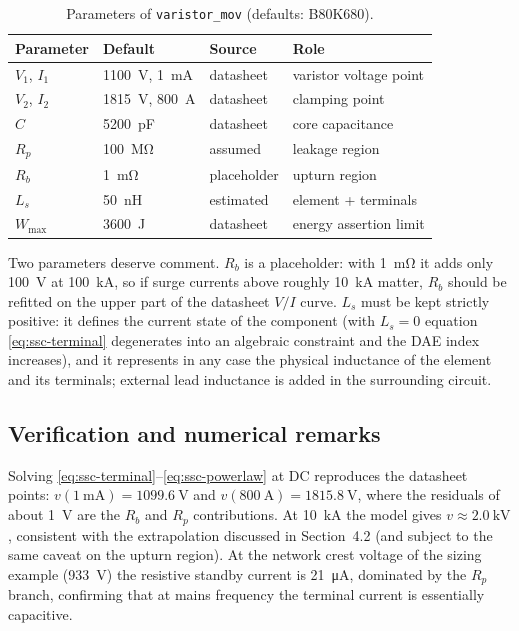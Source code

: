 \documentclass[11pt,a4paper]{article}
\begin{document}
\begin{table}[htb]
\centering
\caption{Parameters of \texttt{varistor\_mov} (defaults: B80K680).}
\label{tab:sscpar}
\begin{tabular}{llll}
\toprule
Parameter & Default & Source & Role \\
\midrule
$V_1$, $I_1$ & \SI{1100}{\volt}, \SI{1}{\milli\ampere} & datasheet & varistor voltage point \\
$V_2$, $I_2$ & \SI{1815}{\volt}, \SI{800}{\ampere} & datasheet & clamping point \\
$C$ & \SI{5200}{\pico\farad} & datasheet & core capacitance \\
$R_p$ & \SI{100}{\mega\ohm} & assumed & leakage region \\
$R_b$ & \SI{1}{\milli\ohm} & placeholder & upturn region \\
$L_s$ & \SI{50}{\nano\henry} & estimated & element + terminals \\
$W_\mathrm{max}$ & \SI{3600}{\joule} & datasheet & energy assertion limit \\
\bottomrule
\end{tabular}
\end{table}

Two parameters deserve comment. $R_b$ is a placeholder: with
\SI{1}{\milli\ohm} it adds only \SI{100}{\volt} at \SI{100}{\kilo\ampere},
so if surge currents above roughly \SI{10}{\kilo\ampere} matter, $R_b$
should be refitted on the upper part of the datasheet $V/I$ curve.
$L_s$ must be kept strictly positive: it defines the current state of the
component (with $L_s = 0$ equation \eqref{eq:ssc-terminal} degenerates into
an algebraic constraint and the DAE index increases), and it represents in
any case the physical inductance of the element and its terminals; external
lead inductance is added in the surrounding circuit.

\subsection{Verification and numerical remarks}

Solving \eqref{eq:ssc-terminal}--\eqref{eq:ssc-powerlaw} at DC reproduces
the datasheet points: $v(\SI{1}{\milli\ampere}) = \SI{1099.6}{\volt}$ and
$v(\SI{800}{\ampere}) = \SI{1815.8}{\volt}$, where the residuals of about
\SI{1}{\volt} are the $R_b$ and $R_p$ contributions. At
\SI{10}{\kilo\ampere} the model gives $v \approx \SI{2.0}{\kilo\volt}$,
consistent with the extrapolation discussed in Section~4.2 (and subject to
the same caveat on the upturn region). At the network crest voltage of the
sizing example (\SI{933}{\volt}) the resistive standby current is
\SI{21}{\micro\ampere}, dominated by the $R_p$ branch, confirming that at
mains frequency the terminal current is essentially capacitive.
\end{document}
